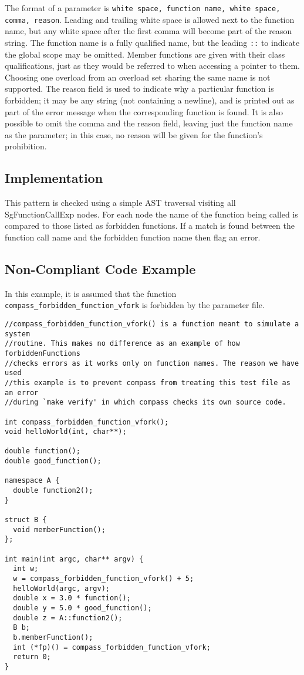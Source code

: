 The format of a parameter is {\tt white space, function name, white space,
comma, reason}.  Leading and trailing white space is allowed next to the
function name, but any white space after the first comma will become part
of the reason string.  The function name is a fully qualified name, but the
leading {\tt ::} to indicate the global scope may be omitted.  Member
functions are given with their class qualifications, just as they would be
referred to when accessing a pointer to them.  Choosing one overload from
an overload set sharing the same name is not supported.  The reason field
is used to indicate why a particular function is forbidden; it may be any
string (not containing a newline), and is printed out as part of the error
message when the corresponding function is found.  It is also possible to
omit the comma and the reason field, leaving just the function name as the
parameter; in this case, no reason will be given for the function's
prohibition.

\subsection{Implementation}
This pattern is checked using a simple AST traversal visiting all SgFunctionCallExp nodes. For each node the name of the function being called is compared to those listed as forbidden functions. If a match is found between the function call name and the forbidden function name then flag an error.

\subsection{Non-Compliant Code Example}
In this example, it is assumed that the function {\tt compass\_forbidden\_function\_vfork} is forbidden by the parameter file.
\begin{verbatim}
//compass_forbidden_function_vfork() is a function meant to simulate a system
//routine. This makes no difference as an example of how forbiddenFunctions
//checks errors as it works only on function names. The reason we have used
//this example is to prevent compass from treating this test file as an error
//during `make verify' in which compass checks its own source code.

int compass_forbidden_function_vfork();
void helloWorld(int, char**);

double function();
double good_function();

namespace A {
  double function2();
}

struct B {
  void memberFunction();
};

int main(int argc, char** argv) {
  int w;
  w = compass_forbidden_function_vfork() + 5;
  helloWorld(argc, argv);
  double x = 3.0 * function();
  double y = 5.0 * good_function();
  double z = A::function2();
  B b;
  b.memberFunction();
  int (*fp)() = compass_forbidden_function_vfork;
  return 0;
}
\end{verbatim}

